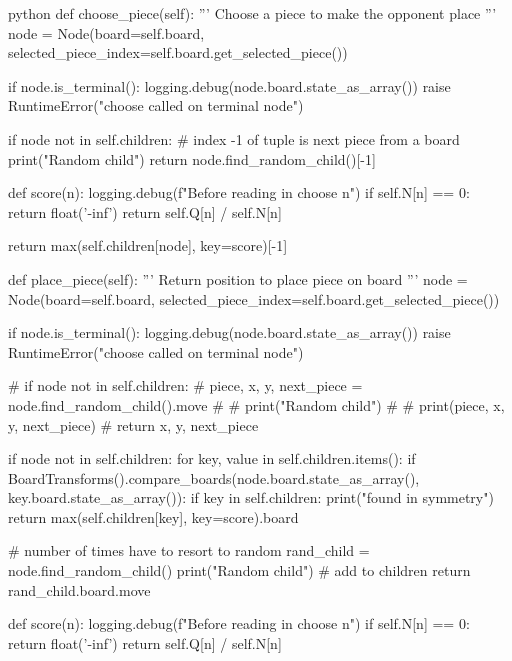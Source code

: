 \begin{mintedbox}{python}
    def choose_piece(self):
        '''
        Choose a piece to make the opponent place
        '''
        node = Node(board=self.board,
                    selected_piece_index=self.board.get_selected_piece())

        if node.is_terminal():
            logging.debug(node.board.state_as_array())
            raise RuntimeError("choose called on terminal node")

        if node not in self.children:
            # index -1 of tuple is next piece from a board
            print("Random child")
            return node.find_random_child()[-1]

        def score(n):
            logging.debug(f"Before reading in choose {n}")
            if self.N[n] == 0:
                return float('-inf')
            return self.Q[n] / self.N[n]

        return max(self.children[node], key=score)[-1]

    def place_piece(self):
        '''
        Return position to place piece on board
        '''
        node = Node(board=self.board,
                    selected_piece_index=self.board.get_selected_piece())

        if node.is_terminal():
            logging.debug(node.board.state_as_array())
            raise RuntimeError("choose called on terminal node")

        # if node not in self.children:
        #     piece, x, y, next_piece = node.find_random_child().move
        #     # print("Random child")
        #     # print(piece, x, y, next_piece)
        #     return x, y, next_piece

        if node not in self.children:
            for key, value in self.children.items():
                if BoardTransforms().compare_boards(node.board.state_as_array(), key.board.state_as_array()):
                    if key in self.children:
                        print("found in symmetry")
                        return max(self.children[key], key=score).board

            # number of times have to resort to random
            rand_child = node.find_random_child()
            print("Random child")
            # add to children
            return rand_child.board.move

        def score(n):
            logging.debug(f"Before reading in choose {n}")
            if self.N[n] == 0:
                return float('-inf')
            return self.Q[n] / self.N[n]


\end{mintedbox}
